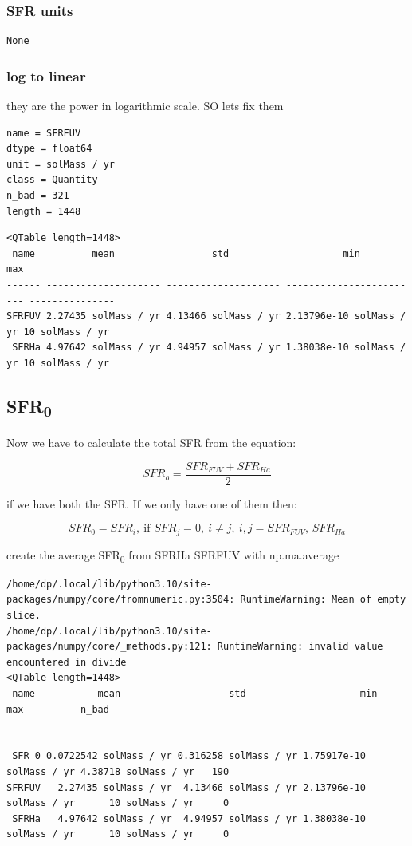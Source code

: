 \documentclass[a4paper]{article}
\begin{document}
\subsubsection{SFR units}
\label{sec:orgbb95c1a}

\begin{verbatim}
None
\end{verbatim}
\subsubsection{log to linear}
\label{sec:org61b8988}

they are the power in logarithmic scale. SO lets fix them


\begin{verbatim}
name = SFRFUV
dtype = float64
unit = solMass / yr
class = Quantity
n_bad = 321
length = 1448
\end{verbatim}


\begin{verbatim}
<QTable length=1448>
 name          mean                 std                    min                  max      
------ -------------------- -------------------- ------------------------ ---------------
SFRFUV 2.27435 solMass / yr 4.13466 solMass / yr 2.13796e-10 solMass / yr 10 solMass / yr
 SFRHa 4.97642 solMass / yr 4.94957 solMass / yr 1.38038e-10 solMass / yr 10 solMass / yr
\end{verbatim}


\subsection{SFR\textsubscript{0}}
\label{sec:org10b773e}


Now we have to calculate the total SFR from the equation:

$$
    SFR_o=\frac{SFR_{FUV}+SFR_{Ha}}{2}
$$

if we have both the SFR. If we only have one of them then:

$$
    SFR_{0}=SFR_{i},\ \text{if } SFR_{j}=0,\ i\neq j,\ i,j=SFR_{FUV},\, SFR_{Ha}
$$


create the average SFR\textsubscript{0} from SFRHa SFRFUV with np.ma.average

\begin{verbatim}
/home/dp/.local/lib/python3.10/site-packages/numpy/core/fromnumeric.py:3504: RuntimeWarning: Mean of empty slice.
/home/dp/.local/lib/python3.10/site-packages/numpy/core/_methods.py:121: RuntimeWarning: invalid value encountered in divide
<QTable length=1448>
 name           mean                   std                    min                    max          n_bad
------ ---------------------- --------------------- ------------------------ -------------------- -----
 SFR_0 0.0722542 solMass / yr 0.316258 solMass / yr 1.75917e-10 solMass / yr 4.38718 solMass / yr   190
SFRFUV   2.27435 solMass / yr  4.13466 solMass / yr 2.13796e-10 solMass / yr      10 solMass / yr     0
 SFRHa   4.97642 solMass / yr  4.94957 solMass / yr 1.38038e-10 solMass / yr      10 solMass / yr     0
\end{verbatim}
\end{document}
